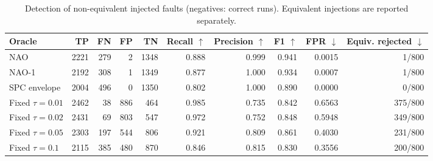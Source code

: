 \begin{table}[t]
\centering
\caption{Detection of non-equivalent injected faults (negatives: correct runs). Equivalent injections are reported separately.}
\label{tab:rq4-faults}
\small
\begin{tabular}{lrrrrrrrrr}
\toprule
Oracle & TP & FN & FP & TN & Recall $\uparrow$ & Precision $\uparrow$ & F1 $\uparrow$ & FPR $\downarrow$ & Equiv. rejected $\downarrow$ \\
\midrule
NAO & 2221 & 279 & 2 & 1348 & 0.888 & 0.999 & 0.941 & 0.0015 & 1/800 \\
NAO-1 & 2192 & 308 & 1 & 1349 & 0.877 & 1.000 & 0.934 & 0.0007 & 1/800 \\
SPC envelope & 2004 & 496 & 0 & 1350 & 0.802 & 1.000 & 0.890 & 0.0000 & 0/800 \\
Fixed $\tau=0.01$ & 2462 & 38 & 886 & 464 & 0.985 & 0.735 & 0.842 & 0.6563 & 375/800 \\
Fixed $\tau=0.02$ & 2431 & 69 & 803 & 547 & 0.972 & 0.752 & 0.848 & 0.5948 & 349/800 \\
Fixed $\tau=0.05$ & 2303 & 197 & 544 & 806 & 0.921 & 0.809 & 0.861 & 0.4030 & 231/800 \\
Fixed $\tau=0.1$ & 2115 & 385 & 480 & 870 & 0.846 & 0.815 & 0.830 & 0.3556 & 200/800 \\
\bottomrule
\end{tabular}
\end{table}
